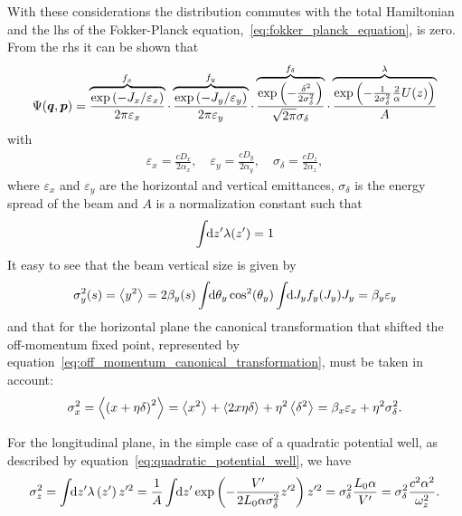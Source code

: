     With these considerations the distribution commutes with the total Hamiltonian and the \gls{lhs} of the Fokker-Planck equation,~\eqref{eq:fokker_planck_equation}, is zero. From the \gls{rhs} it can be shown that
    \begin{align}\label{eq:equilibrium_distribution}
        \Psi(\boldsymbol{q},\boldsymbol{p}) =
        \overbrace{
        \frac{\exp\left(-J_x/\varepsilon_x\right)}{2\pi\varepsilon_x}}^{f_x}\cdot
        \overbrace{
        \frac{\exp\left(-J_y/\varepsilon_y\right)}{2\pi\varepsilon_y}}^{f_y}\cdot
        \overbrace{
        \frac{\exp\left(-\frac{\delta^2}{2\sigma_\delta^2}\right)}{\sqrt{2\pi}\sigma_\delta}}^{f_\delta}\cdot
        \overbrace{
        \frac{\exp\left(-\frac{1}{2\sigma_\delta^2}\frac2\alpha U(z)\right)}{A}}^{\lambda}
    \end{align}
    with
    \begin{align}
        \varepsilon_x = \frac{cD_x}{2\alpha_x}, \quad
        \varepsilon_y = \frac{cD_y}{2\alpha_y}, \quad
        \sigma_\delta = \frac{cD_z}{2\alpha_z},
    \end{align}
    where $\varepsilon_x$ and $\varepsilon_y$ are the horizontal and vertical emittances, $\sigma_\delta$ is the energy spread of the beam and $A$ is a normalization constant such that
    \begin{align}
        \int\!\!\text{d}z' \lambda(z')=1
    \end{align}
    It easy to see that the beam vertical size is given by
    \begin{align}
        \sigma_y^2(s) = \left\langle y^2 \right\rangle_{{}} = 2\beta_y(s)\int\!\!\text{d}\theta_y \cos^2(\theta_y)\int\!\!\text{d}J_y f_y(J_y)J_y = \beta_y\varepsilon_y
    \end{align}
    and that for the horizontal plane the canonical transformation that shifted the off-momentum fixed point, represented by equation~\eqref{eq:off_momentum_canonical_transformation}, must be taken in account:
    \begin{align}
        \sigma_x^2 = \left\langle \left(x+\eta\delta\right)^2 \right\rangle_{{}} = \left\langle x^2 \right\rangle_{{}} + \left\langle 2x\eta\delta \right\rangle_{{}} + \eta^2\left\langle \delta^2 \right\rangle_{{}} = \beta_x\varepsilon_x + \eta^2\sigma_\delta^2.
    \end{align}

    For the longitudinal plane, in the simple case of a quadratic potential well, as described by equation~\eqref{eq:quadratic_potential_well}, we have
    \begin{align}
        \sigma_z^2 = \int\!\!\text{d}z' \lambda\left(z'\right)z'^2 =
        \frac1A\int\!\!\text{d}z' 
            \exp\left(-\frac{V'}{2L_0\alpha\sigma_\delta^2} z'^2\right)z'^2
        = \sigma_\delta^2\frac{L_0\alpha}{V'} = \sigma_\delta^2 \frac{c^2\alpha^2}{\omega_z^2}.
    \end{align}


